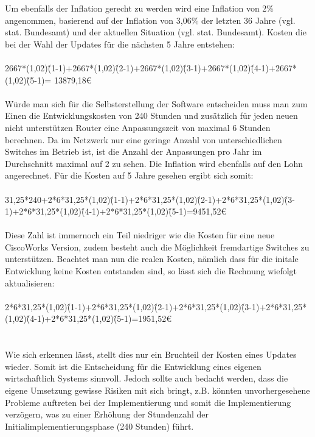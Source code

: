 Um ebenfalls der Inflation gerecht zu werden wird eine Inflation von 2\% angenommen, basierend auf der Inflation von 3,06\% der letzten 36 Jahre (vgl. stat. Bundesamt) und der aktuellen Situation (vgl. stat. Bundesamt).
Kosten die bei der Wahl der Updates für die nächsten 5 Jahre entstehen:\\
\\
2667*(1,02)\^(1-1)+2667*(1,02)\^(2-1)+2667*(1,02)\^(3-1)+2667*(1,02)\^(4-1)+2667*(1,02)\^(5-1)=
13879,18€\\
\\
Würde man sich für die Selbsterstellung der Software entscheiden muss man zum Einen die Entwicklungskosten von 240 Stunden und zusätzlich für jeden neuen nicht unterstützen Router eine Anpassungszeit von maximal 6 Stunden berechnen. Da im Netzwerk nur eine geringe Anzahl von unterschiedlichen Switches im Betrieb ist, ist die Anzahl der Anpassungen pro Jahr im Durchschnitt maximal auf 2 zu sehen. Die Inflation wird ebenfalls auf den Lohn angerechnet. Für die Kosten auf 5 Jahre gesehen ergibt sich somit:\\
\\
31,25*240+2*6*31,25*(1,02)\^(1-1)+2*6*31,25*(1,02)\^(2-1)+2*6*31,25*(1,02)\^(3-1)+2*6*31,25*(1,02)\^(4-1)+2*6*31,25*(1,02)\^(5-1)=9451,52€\\
\\
Diese Zahl ist immernoch ein Teil niedriger wie die Kosten für eine neue CiscoWorks Version, zudem besteht auch die Möglichkeit fremdartige Switches zu unterstützen. Beachtet man nun die realen Kosten, nämlich dass für die initale Entwicklung keine Kosten entstanden sind, so lässt sich die Rechnung wiefolgt aktualisieren:\\
\\
2*6*31,25*(1,02)\^(1-1)+2*6*31,25*(1,02)\^(2-1)+2*6*31,25*(1,02)\^(3-1)+2*6*31,25*(1,02)\^(4-1)+2*6*31,25*(1,02)\^(5-1)=1951,52€\\
\\
\\
Wie sich erkennen lässt, stellt dies nur ein Bruchteil der Kosten eines Updates wieder.
Somit ist die Entscheidung für die Entwicklung eines eigenen wirtschaftlich Systems sinnvoll.
Jedoch sollte auch bedacht werden, dass die eigene Umsetzung gewisse Risiken mit sich bringt, z.B. könnten unvorhergesehene Probleme auftreten bei der Implementierung und somit die Implementierung verzögern, was zu einer Erhöhung der Stundenzahl der Initialimplementierungsphase (240 Stunden) führt.\\